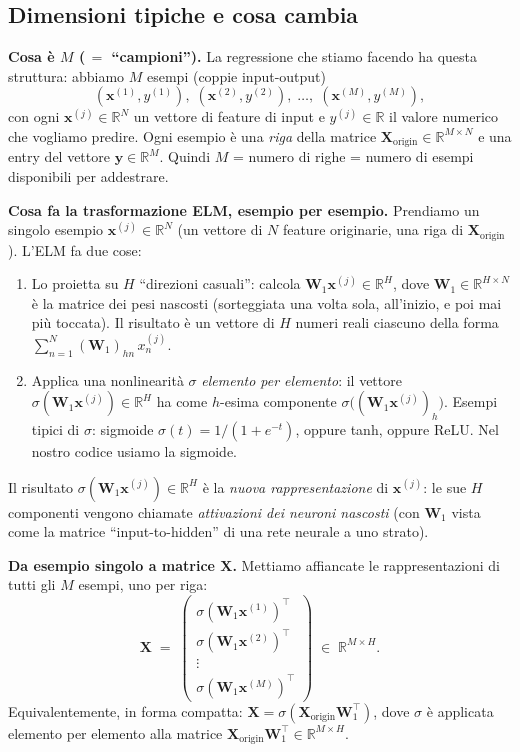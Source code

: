 \documentclass[11pt,a4paper]{article}
\newcommand{\R}{\mathbb{R}}
\newcommand{\bx}{\mathbf{x}}
\newcommand{\by}{\mathbf{y}}
\newcommand{\bX}{\mathbf{X}}
\newcommand{\bW}{\mathbf{W}}
\theoremstyle{definition}
\begin{document}
\subsection{Dimensioni tipiche e cosa cambia}

\textbf{Cosa è $M$ ($\,=$ ``campioni'').} La regressione che stiamo facendo ha questa struttura: abbiamo $M$ esempi (coppie input-output)
\[
(\bx^{(1)}, y^{(1)}),\;(\bx^{(2)}, y^{(2)}),\;\dots,\;(\bx^{(M)}, y^{(M)}),
\]
con ogni $\bx^{(j)}\in\R^N$ un vettore di feature di input e $y^{(j)}\in\R$ il valore numerico che vogliamo predire. Ogni esempio è una \emph{riga} della matrice $\bX_{\text{origin}}\in\R^{M\times N}$ e una entry del vettore $\by\in\R^M$. Quindi $M$ = numero di righe = numero di esempi disponibili per addestrare.

\textbf{Cosa fa la trasformazione ELM, esempio per esempio.} Prendiamo un singolo esempio $\bx^{(j)}\in\R^N$ (un vettore di $N$ feature originarie, una riga di $\bX_{\text{origin}}$). L'ELM fa due cose:
\begin{enumerate}[label=(\arabic*),leftmargin=*]
\item Lo proietta su $H$ ``direzioni casuali'': calcola $\bW_1\bx^{(j)}\in\R^H$, dove $\bW_1\in\R^{H\times N}$ è la matrice dei pesi nascosti (sorteggiata una volta sola, all'inizio, e poi mai più toccata). Il risultato è un vettore di $H$ numeri reali ciascuno della forma $\sum_{n=1}^N (\bW_1)_{hn}\,x^{(j)}_n$.
\item Applica una nonlinearità $\sigma$ \emph{elemento per elemento}: il vettore $\sigma(\bW_1\bx^{(j)})\in\R^H$ ha come $h$-esima componente $\sigma\bigl((\bW_1\bx^{(j)})_h\bigr)$. Esempi tipici di $\sigma$: sigmoide $\sigma(t) = 1/(1+e^{-t})$, oppure tanh, oppure ReLU. Nel nostro codice usiamo la sigmoide.
\end{enumerate}
Il risultato $\sigma(\bW_1\bx^{(j)})\in\R^H$ è la \emph{nuova rappresentazione} di $\bx^{(j)}$: le sue $H$ componenti vengono chiamate \emph{attivazioni dei neuroni nascosti} (con $\bW_1$ vista come la matrice ``input-to-hidden'' di una rete neurale a uno strato).

\smallskip
\textbf{Da esempio singolo a matrice $\bX$.} Mettiamo affiancate le rappresentazioni di tutti gli $M$ esempi, uno per riga:
\[
\bX \;=\;
\begin{pmatrix}
\sigma(\bW_1\bx^{(1)})^\top \\
\sigma(\bW_1\bx^{(2)})^\top \\
\vdots \\
\sigma(\bW_1\bx^{(M)})^\top
\end{pmatrix}
\;\in\;\R^{M\times H}.
\]
Equivalentemente, in forma compatta: $\bX = \sigma(\bX_{\text{origin}}\bW_1^\top)$, dove $\sigma$ è applicata elemento per elemento alla matrice $\bX_{\text{origin}}\bW_1^\top\in\R^{M\times H}$.
\end{document}
